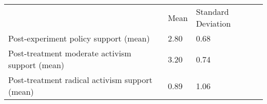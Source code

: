\documentclass{article}
\begin{document}
\begin{table}[!h]
\centering
\begin{tabular}{lll}
\cline{1-3}
\multicolumn{1}{|l}{} &
  \multicolumn{1}{|l}{Mean} &
  \multicolumn{1}{|l|}{Standard Deviation} \\
\cline{1-3}
\multicolumn{1}{|l}{Post-experiment policy support (mean)} &
  \multicolumn{1}{|l}{2.80} &
  \multicolumn{1}{|l|}{0.68} \\
\cline{1-3}
\multicolumn{1}{|l}{Post-treatment moderate activism support (mean)} &
  \multicolumn{1}{|l}{3.20} &
  \multicolumn{1}{|l|}{0.74} \\
\cline{1-3}
\multicolumn{1}{|l}{Post-treatment radical activism support (mean)} &
  \multicolumn{1}{|l}{0.89} &
  \multicolumn{1}{|l|}{1.06} \\
\cline{1-3}
\end{tabular}
\end{table}
\end{document}
